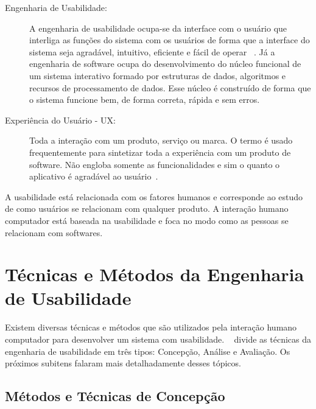 \begin{description}
\item[Engenharia de Usabilidade:]

A engenharia de usabilidade ocupa-se da interface com o usuário que interliga as funções do sistema com os usuários de forma que a interface do sistema seja agradável, intuitivo, eficiente e fácil de operar ~\cite{cybis2010}. Já a engenharia de software ocupa do desenvolvimento do núcleo funcional de um sistema interativo formado por estruturas de dados, algoritmos e recursos de processamento de dados. Esse núcleo é construído de forma que o sistema funcione bem, de forma correta, rápida e sem erros.
%


\item[Experiência do Usuário - UX: ]

Toda a interação com um produto, serviço ou marca. O termo é usado frequentemente para sintetizar toda a experiência com um produto de software. Não engloba  somente as funcionalidades e sim o quanto o aplicativo é agradável ao usuário~\cite{travis2013}.
%	


\end{description}

A usabilidade está relacionada com os fatores humanos e corresponde ao estudo de como usuários se relacionam com qualquer produto. A interação humano computador está baseada na usabilidade e foca no modo como as pessoas se relacionam com softwares.


\section{Técnicas e Métodos da Engenharia de Usabilidade}


Existem diversas técnicas e métodos que são utilizados pela interação humano computador para desenvolver um sistema com usabilidade. ~ divide as técnicas da engenharia de usabilidade em três tipos: Concepção, Análise e Avaliação. Os próximos subitens falaram mais detalhadamente desses tópicos.

\subsection{Métodos e Técnicas de Concepção}

